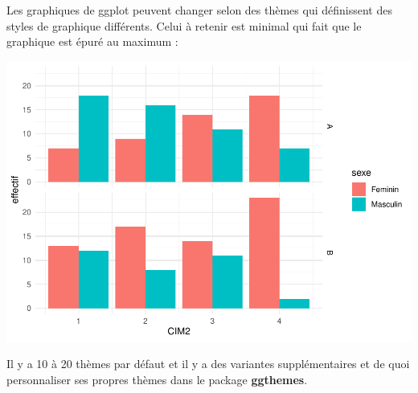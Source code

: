 \documentclass[
]{book}
\newenvironment{Shaded}{\begin{snugshade}}{\end{snugshade}}
\newcommand{\AttributeTok}[1]{\textcolor[rgb]{0.13,0.29,0.53}{#1}}
\newcommand{\FunctionTok}[1]{\textcolor[rgb]{0.13,0.29,0.53}{\textbf{#1}}}
\newcommand{\NormalTok}[1]{#1}
\newcommand{\OtherTok}[1]{\textcolor[rgb]{0.56,0.35,0.01}{#1}}
\newcommand{\SpecialCharTok}[1]{\textcolor[rgb]{0.81,0.36,0.00}{\textbf{#1}}}
\newcommand{\StringTok}[1]{\textcolor[rgb]{0.31,0.60,0.02}{#1}}
\begin{document}
Les graphiques de ggplot peuvent changer selon des thèmes qui définissent des styles
de graphique différents. Celui à retenir est minimal qui fait que le graphique
est épuré au maximum :

\begin{Shaded}
\end{Shaded}

\includegraphics{_main_files/figure-latex/unnamed-chunk-82-1.pdf}

Il y a 10 à 20 thèmes par défaut et il y a des variantes supplémentaires et de
quoi personnaliser ses propres thèmes dans le package \textbf{ggthemes}.
\end{document}
